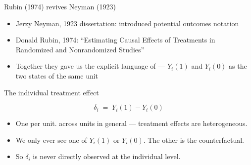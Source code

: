 \documentclass[aspectratio=169,11pt]{beamer}
\begin{document}
\begin{frame}{Rubin (1974) revives Neyman (1923)}
\vspace{0.6em}
\begin{itemize}
  \item Jerzy Neyman, 1923 dissertation: introduced potential outcomes notation
  \item Donald Rubin, 1974: ``Estimating Causal Effects of Treatments in Randomized and Nonrandomized Studies''
  \item Together they gave us the explicit language of  --- $Y_i(1)$ and $Y_i(0)$ as the two states of the same unit
\end{itemize}
\vspace{0.5em}
\end{frame}

\begin{frame}{The individual treatment effect}
\vspace{1.4em}
\begin{center}
\Large
\[
\delta_i \;=\; Y_i(1) - Y_i(0)
\]
\end{center}
\vspace{0.6em}
\begin{itemize}
  \item One per unit.  across units in general --- treatment effects are heterogeneous.
  \item We only ever see one of $Y_i(1)$ or $Y_i(0)$. The other is the counterfactual.
  \item So $\delta_i$ is never directly observed at the individual level.
\end{itemize}
\end{frame}
\end{document}

